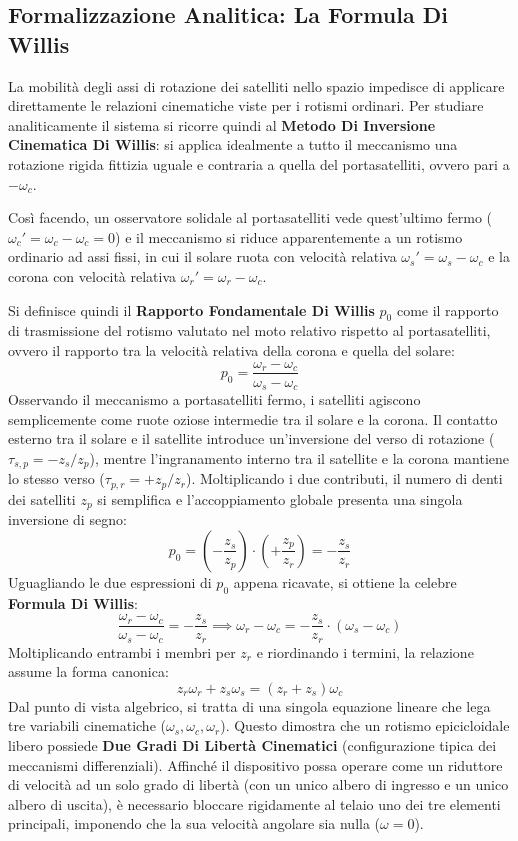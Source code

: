 ﻿\documentclass[11pt, a4paper]{article}
\begin{document}
\newpage

\subsection{Formalizzazione Analitica: La Formula Di Willis}
La mobilità degli assi di rotazione dei satelliti nello spazio impedisce di applicare direttamente le relazioni cinematiche viste per i rotismi ordinari. Per studiare analiticamente il sistema si ricorre quindi al \textbf{Metodo Di Inversione Cinematica Di Willis}: si applica idealmente a tutto il meccanismo una rotazione rigida fittizia uguale e contraria a quella del portasatelliti, ovvero pari a $-\omega_c$.

Così facendo, un osservatore solidale al portasatelliti vede quest'ultimo fermo ($\omega_c' = \omega_c - \omega_c = 0$) e il meccanismo si riduce apparentemente a un rotismo ordinario ad assi fissi, in cui il solare ruota con velocità relativa $\omega_s' = \omega_s - \omega_c$ e la corona con velocità relativa $\omega_r' = \omega_r - \omega_c$.

Si definisce quindi il \textbf{Rapporto Fondamentale Di Willis} $p_0$ come il rapporto di trasmissione del rotismo valutato nel moto relativo rispetto al portasatelliti, ovvero il rapporto tra la velocità relativa della corona e quella del solare:
\[
    p_0 = \frac{\omega_r - \omega_c}{\omega_s - \omega_c}
    \label{eq:willis_fondamentale}
\]
Osservando il meccanismo a portasatelliti fermo, i satelliti agiscono semplicemente come ruote oziose intermedie tra il solare e la corona. Il contatto esterno tra il solare e il satellite introduce un'inversione del verso di rotazione ($\tau_{s,p} = -z_s/z_p$), mentre l'ingranamento interno tra il satellite e la corona mantiene lo stesso verso ($\tau_{p,r} = +z_p/z_r$). Moltiplicando i due contributi, il numero di denti dei satelliti $z_p$ si semplifica e l'accoppiamento globale presenta una singola inversione di segno:
\[
    p_0 = \left( -\frac{z_s}{z_p} \right) \cdot \left( +\frac{z_p}{z_r} \right) = -\frac{z_s}{z_r}
    \label{eq:rapporto_willis_denti}
\]
Uguagliando le due espressioni di $p_0$ appena ricavate, si ottiene la celebre \textbf{Formula Di Willis}:
\[
    \frac{\omega_r - \omega_c}{\omega_s - \omega_c} = -\frac{z_s}{z_r} \implies \omega_r - \omega_c = -\frac{z_s}{z_r} \cdot (\omega_s - \omega_c)
\]
Moltiplicando entrambi i membri per $z_r$ e riordinando i termini, la relazione assume la forma canonica:
\[
    \boxed{z_r \omega_r + z_s \omega_s = (z_r + z_s) \omega_c}
    \label{eq:formula_willis_risolta}
\]
Dal punto di vista algebrico, si tratta di una singola equazione lineare che lega tre variabili cinematiche ($\omega_s, \omega_c, \omega_r$). Questo dimostra che un rotismo epicicloidale libero possiede \textbf{Due Gradi Di Libertà Cinematici} (configurazione tipica dei meccanismi differenziali). Affinché il dispositivo possa operare come un riduttore di velocità ad un solo grado di libertà (con un unico albero di ingresso e un unico albero di uscita), è necessario bloccare rigidamente al telaio uno dei tre elementi principali, imponendo che la sua velocità angolare sia nulla ($\omega = 0$).
\end{document}

